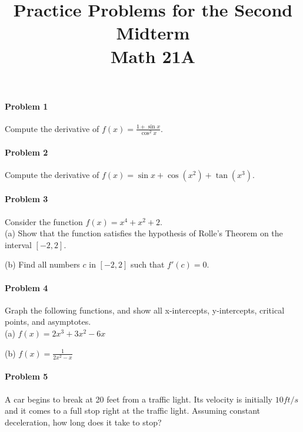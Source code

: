 \documentclass[a4paper,11pt]{article}
\title{Practice Problems for the Second Midterm \\ Math 21A}
\begin{document}
\maketitle

\paragraph{Problem 1}
Compute the derivative of $f(x)=\frac{1 + \sin x}{\cos ^2 x}$.
\vspace{1.5in}

\paragraph{Problem 2}
Compute the derivative of $f(x)=\sin x + \cos (x^2) + \tan (x^3)$.
\vspace{1.5in}

\paragraph{Problem 3}
Consider the function $f(x) = x^4 + x^2 + 2$.  \\

(a) Show that the function satisfies the hypothesis of Rolle's Theorem on the interval $[-2,2]$.
\vspace{1in}

(b) Find all numbers $c$ in $[-2,2]$ such that $f'(c)=0$.
\vspace{1in}

\paragraph{Problem 4}
Graph the following functions, and show all x-intercepts, y-intercepts, critical points, and asymptotes. \\

(a) $f(x) = 2x^3 + 3x^2 - 6x$
\vspace{2in}

(b) $f(x) = \frac{1}{2x^2 - x}$
\vspace{2in}

\paragraph{Problem 5}
A car begins to break at 20 feet from a traffic light.  Its velocity is initially $10 ft/s$ and it comes to a full stop right at the traffic light.  Assuming constant deceleration, how long does it take to stop?
\end{document}
